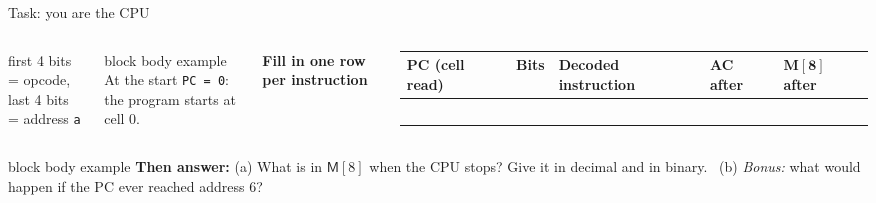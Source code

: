 \documentclass[aspectratio=169,10pt]{beamer}
\begin{document}
\begin{frame}{Task: you are the CPU}
\begin{columns}[T,onlytextwidth]
      \tiny first 4 bits = opcode,\\ last 4 bits = address \texttt{a}\\[0.15cm]
      \begin{beamercolorbox}[rounded=true,sep=0.08cm,wd=\linewidth]{block body example}
        \centering\scriptsize
        At the start \texttt{PC = 0}:\\ the program starts at cell 0.
      \end{beamercolorbox}
      \centering
      \footnotesize\textbf{Fill in one row per instruction}\\[0.05cm]
      \scriptsize
      \renewcommand{\arraystretch}{1.45}
      \begin{tabular}{|>{\centering\arraybackslash}p{0.95cm}|>{\centering\arraybackslash}p{1.35cm}|>{\centering\arraybackslash}p{1.5cm}|>{\centering\arraybackslash}p{0.9cm}|>{\centering\arraybackslash}p{0.9cm}|}
        \hline
        \textbf{PC (cell read)} & \textbf{Bits} & \textbf{Decoded instruction} & \textbf{AC after} & $\mathbf{M[8]}$ \textbf{after} \\
        \hline
        0 & & & & \\ \hline
          & & & & \\ \hline
          & & & & \\ \hline
          & & & & \\ \hline
          & & & & \\ \hline
      \end{tabular}
  \end{columns}
  \vfill
  \begin{beamercolorbox}[rounded=true,sep=0.1cm,wd=\textwidth]{block body example}
    \footnotesize
    \textbf{Then answer:} (a) What is in $\mathsf{M}[8]$ when the CPU stops? Give it in decimal and in binary.
    \ (b) \emph{Bonus:} what would happen if the PC ever reached address 6?
  \end{beamercolorbox}
\end{frame}
\end{document}
